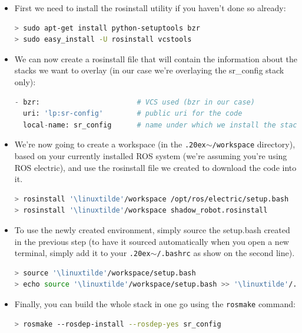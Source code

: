 \documentclass[12pt]{article}
\newcommand{\linuxtilde}{\raise.20ex\hbox{$\scriptstyle\mathtt{\sim}$}}
\begin{document}
\begin{itemize}
\item First we need to install the rosinstall utility if you haven't done so already:
  \begin{lstlisting}[language=Bash]
> sudo apt-get install python-setuptools bzr
> sudo easy_install -U rosinstall vcstools
  \end{lstlisting}

\item We can now create a rosinstall file that will contain the information about the stacks we want to overlay (in our case we're overlaying the sr\_config stack only):
  \begin{lstlisting}[title={\textbf{shadow\_robot.rosinstall}}, language=Python]
- bzr:                       # VCS used (bzr in our case)
  uri: 'lp:sr-config'        # public uri for the code
  local-name: sr_config      # name under which we install the stack
  \end{lstlisting}

\item We're now going to create a workspace (in the \texttt{\linuxtilde/workspace} directory), based on your currently installed ROS system (we're assuming you're using ROS electric), and use the rosinstall file we created to download the code into it.
  \begin{lstlisting}[escapeinside='', language=Bash]
> rosinstall '\linuxtilde'/workspace /opt/ros/electric/setup.bash
> rosinstall '\linuxtilde'/workspace shadow_robot.rosinstall
  \end{lstlisting}

\item To use the newly created environment, simply source the setup.bash created in the previous step (to have it sourced automatically when you open a new terminal, simply add it to your \texttt{\linuxtilde/.bashrc} as show on the second line).
  \begin{lstlisting}[escapeinside='', language=Bash]
> source '\linuxtilde'/workspace/setup.bash
> echo source '\linuxtilde'/workspace/setup.bash >> '\linuxtilde'/.bashrc
  \end{lstlisting}

\item Finally, you can build the whole stack in one go using the \texttt{rosmake} command:
  \begin{lstlisting}[escapeinside='', language=Bash]
> rosmake --rosdep-install --rosdep-yes sr_config
  \end{lstlisting}

\end{itemize}
\end{document}
